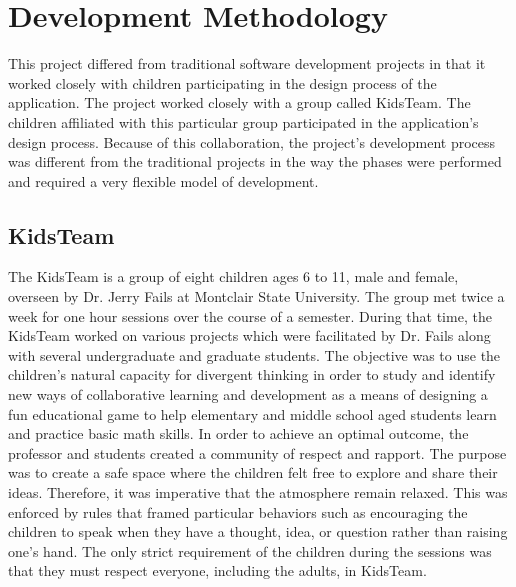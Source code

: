 
\chapter{Development Methodology} %

\label{Chapter2} %



This project differed from traditional software development projects in that it worked closely with children participating in the design process of the application. The project worked closely with a group called KidsTeam. The children affiliated with this particular group participated in the application's design process. Because of this collaboration, the project's development process was different from the traditional projects in the way the phases were performed and required a very flexible model of development. 

\section{KidsTeam}
The KidsTeam is a group of eight children ages 6 to 11, male and female, overseen by Dr. Jerry Fails at Montclair State University. The group met twice a week for one hour sessions over the course of a semester. During that time, the KidsTeam worked on various projects which were facilitated by Dr. Fails along with several undergraduate and graduate students.  The objective was to use the children's natural capacity for divergent thinking in order to study and identify new ways of collaborative learning and development as a means of designing a fun educational game to help elementary and middle school aged students learn and practice basic math skills. In order to achieve an optimal outcome, the professor and students created a community of respect and rapport. The purpose was to create a safe space where the children felt free to explore and share their ideas. Therefore, it was imperative that the atmosphere remain relaxed. This was enforced by rules that framed particular behaviors such as encouraging the children to speak when they have a thought, idea, or question rather than raising one's hand. The only strict requirement of the children during the sessions was that they must respect everyone, including the adults, in KidsTeam. 

